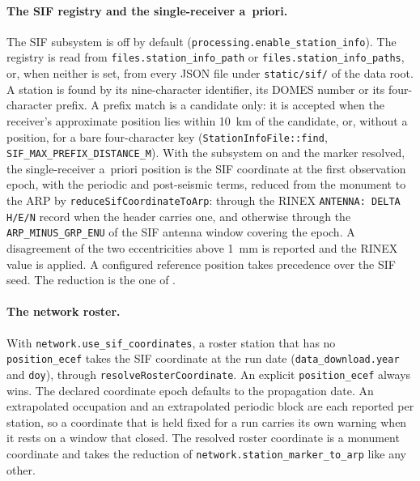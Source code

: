 \documentclass[main.tex]{subfiles}
\begin{document}
\paragraph{The SIF registry and the single-receiver a~priori.}
The SIF subsystem is off by default (\texttt{processing.enable\_station\_info}).
The registry is read from \texttt{files.station\_info\_path} or
\texttt{files.station\_info\_paths}, or, when neither is set, from every
JSON file under \texttt{static/sif/} of the data root.  A station is
found by its nine-character identifier, its DOMES number or its
four-character prefix.  A prefix match is a candidate only: it is
accepted when the receiver's approximate position lies within
\SI{10}{\kilo\metre} of the candidate, or, without a position, for a bare
four-character key
(\texttt{StationInfoFile::find}, \texttt{SIF\_MAX\_PREFIX\_DISTANCE\_M}).
With the subsystem on and the marker resolved, the single-receiver
a~priori position is the SIF coordinate at the first observation epoch,
with the periodic and post-seismic terms, reduced from the monument to
the ARP by \texttt{reduceSifCoordinateToArp}: through the RINEX
\texttt{ANTENNA: DELTA H/E/N} record when the header carries one, and
otherwise through the \texttt{ARP\_MINUS\_GRP\_ENU} of the SIF antenna
window covering the epoch.  A disagreement of the two eccentricities
above \SI{1}{\milli\metre} is reported and the RINEX value is applied.  A
configured reference position takes precedence over the SIF seed.  The
reduction is the one of .

\paragraph{The network roster.}
With \texttt{network.use\_sif\_coordinates}, a roster station that has no
\texttt{position\_ecef} takes the SIF coordinate at the run date
(\texttt{data\_download.year} and \texttt{doy}), through
\texttt{resolveRosterCoordinate}.  An explicit \texttt{position\_ecef}
always wins.  The declared coordinate epoch defaults to the propagation
date.  An extrapolated occupation and an extrapolated periodic block are
each reported per station, so a coordinate that is held fixed for a run
carries its own warning when it rests on a window that closed.  The
resolved roster coordinate is a monument coordinate and takes the
reduction of \texttt{network.station\_marker\_to\_arp} like any other.
\end{document}

